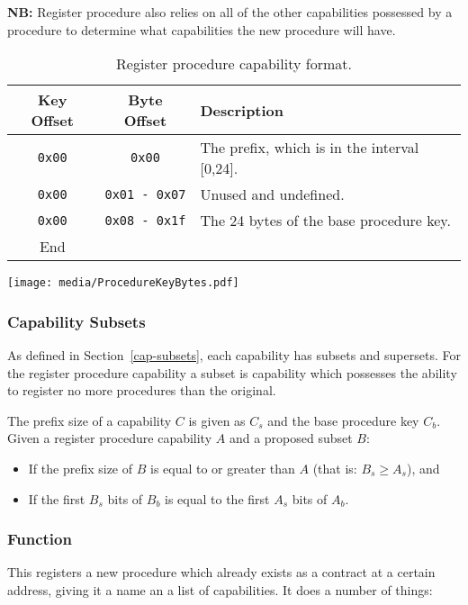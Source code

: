 \documentclass[english,a4paper]{article}
\let\oldparagraph\subsubsection
\renewcommand{\subsubsection}[1]{\oldparagraph{#1}\mbox{}}
\begin{document}
\textbf{NB:} Register procedure also relies on all of the other capabilities
possessed by a procedure to determine what capabilities the new procedure will
have.

\begin{table}[H]
  \caption{Register procedure capability format.}
  \centering{}%
  \begin{tabularx}{\textwidth}{c|c|X}
    \hline
    Key Offset & Byte Offset & Description \\
    \hline
    \hline
    \texttt{0x00} & \texttt{0x00} & The prefix, which is in the interval [0,24]. \\
    \texttt{0x00} & \texttt{0x01 - 0x07} & Unused and undefined. \\
    \texttt{0x00} & \texttt{0x08 - 0x1f} & The 24 bytes of the base procedure key. \\
    \hline
    End &   \\
    \hline
  \end{tabularx}
\end{table}

\texttt{[image: media/ProcedureKeyBytes.pdf]}

\subsubsection{Capability Subsets}
As defined in Section~\ref{cap-subsets}, each capability has subsets and
supersets. For the register procedure capability a subset is capability which
possesses the ability to register no more procedures than the original.

The prefix size of a capability $C$ is given as $C_s$ and the base procedure key
$C_b$. Given a register procedure capability $A$ and a proposed subset $B$:
\begin{itemize}
  \item If the prefix size of $B$ is equal to or greater than $A$ (that is: $B_s
  \geq A_s$), and
  \item If the first $B_s$ bits of $B_b$ is equal to the first $A_s$ bits of
  $A_b$.
\end{itemize}

\subsubsection{Function}
This registers a new procedure which already exists as a contract at a certain
address, giving it a name an a list of capabilities. It does a number of things:
\end{document}
